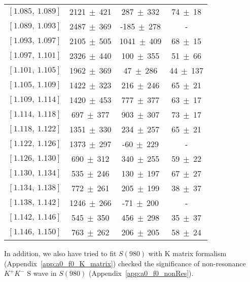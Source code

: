 {\begin{table}[htbp]
\begin{center}
\begin{tabular}{cccc}
                $[1.085,\ 1.089]$   &	2121$\ \pm\ $421&	287$\ \pm\ $332&	74$\ \pm\ $18 \\ 	
                $[1.089,\ 1.093]$   &	2487$\ \pm\ $369&	-185$\ \pm\ $278&	 - \\ 	
                $[1.093,\ 1.097]$   &	2105$\ \pm\ $505&	1041$\ \pm\ $409&	68$\ \pm\ $15 \\ 	
                $[1.097,\ 1.101]$   &	2326$\ \pm\ $440&	100$\ \pm\ $355&	51$\ \pm\ $66 \\ 	
                $[1.101,\ 1.105]$   &	1962$\ \pm\ $369&	47$\ \pm\ $286&	44$\ \pm\ $137 \\ 	
                $[1.105,\ 1.109]$   &	1422$\ \pm\ $323&	216$\ \pm\ $246&	65$\ \pm\ $21 \\ 	
                $[1.109,\ 1.114]$   &	1420$\ \pm\ $453&	777$\ \pm\ $377&	63$\ \pm\ $17 \\ 	
                $[1.114,\ 1.118]$   &	697$\ \pm\ $377&	903$\ \pm\ $307&	73$\ \pm\ $17 \\ 	
                $[1.118,\ 1.122]$   &	1351$\ \pm\ $330&	234$\ \pm\ $257&	65$\ \pm\ $21 \\ 	
                $[1.122,\ 1.126]$   &	1373$\ \pm\ $297&	-60$\ \pm\ $229&	 - \\ 	
                $[1.126,\ 1.130]$   &	690$\ \pm\ $312&	340$\ \pm\ $255&	59$\ \pm\ $22 \\ 	
                $[1.130,\ 1.134]$   &	535$\ \pm\ $246&	130$\ \pm\ $197&	67$\ \pm\ $27 \\ 	
                $[1.134,\ 1.138]$   &	772$\ \pm\ $261&	205$\ \pm\ $199&	38$\ \pm\ $37 \\ 	
                $[1.138,\ 1.142]$   &	1246$\ \pm\ $266&	-71$\ \pm\ $200&	 - \\ 	
                $[1.142,\ 1.146]$   &	545$\ \pm\ $350&	456$\ \pm\ $298&	35$\ \pm\ $37 \\ 	
                $[1.146,\ 1.150]$   &	763$\ \pm\ $262&	206$\ \pm\ $205&	58$\ \pm\ $24 \\ 	
                \bottomrule\bottomrule
            \end{tabular}
        \end{center}
    \end{table}


    In addition, we also have tried to fit $S(980)$ with K matrix formalism (Appendix~\ref{app:a0_f0_K_matrix}) checked the significance of non-resonance $K^{+}K^{-}$ S wave in $S(980)$ (Appendix~\ref{app:a0_f0_nonRes}).


}

